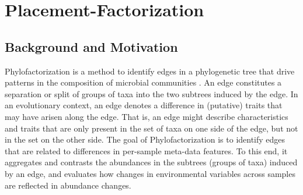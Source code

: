 
\chapter{Placement-Factorization}
\label{ch:Factorization}




\section{Background and Motivation}
\label{ch:Factorization:sec:Motivation}

Phylofactorization is a method to identify edges in a phylogenetic tree
that drive patterns in the composition of microbial communities \cite{Washburne2017a}.
An edge constitutes a separation or split of groups of taxa into the two subtrees induced by the edge.
In an evolutionary context, an edge denotes a difference in (putative) traits that may have arisen along the edge.
That is, an edge might describe characteristics and traits
that are only present in the set of taxa on one side of the edge, but not in the set on the other side.
The goal of Phylofactorization is to identify edges that are related to differences in per-sample meta-data features.
To this end, it aggregates and contrasts the abundances in the subtrees (groups of taxa) induced by an edge,
and evaluates how changes in environmental variables across samples are reflected in abundance changes.

